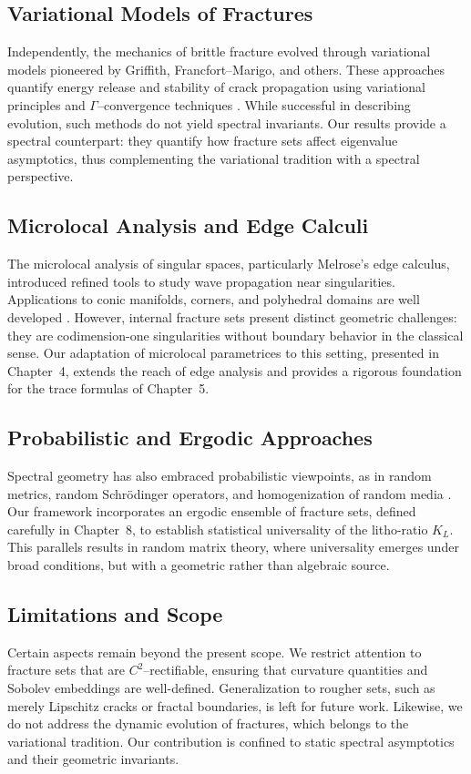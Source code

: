 \subsection{Variational Models of Fractures}
Independently, the mechanics of brittle fracture evolved through variational
models pioneered by Griffith, Francfort--Marigo, and others. These approaches
quantify energy release and stability of crack propagation using variational
principles and $\Gamma$--convergence techniques
\cite{FrancfortMarigo1998, Braides2002}. While successful in describing
evolution, such methods do not yield spectral invariants. Our results provide a
spectral counterpart: they quantify how fracture sets affect eigenvalue
asymptotics, thus complementing the variational tradition with a spectral
perspective.

\subsection{Microlocal Analysis and Edge Calculi}
The microlocal analysis of singular spaces, particularly Melrose's edge
calculus, introduced refined tools to study wave propagation near singularities.
Applications to conic manifolds, corners, and polyhedral domains are well
developed \cite{Melrose1993}. However, internal fracture sets present distinct
geometric challenges: they are codimension-one singularities without boundary
behavior in the classical sense. Our adaptation of microlocal parametrices to
this setting, presented in Chapter~4, extends the reach of edge analysis and
provides a rigorous foundation for the trace formulas of Chapter~5.

\subsection{Probabilistic and Ergodic Approaches}
Spectral geometry has also embraced probabilistic viewpoints, as in random
metrics, random Schrödinger operators, and homogenization of random media
\cite{PasturFigotin1992}. Our framework incorporates an ergodic ensemble of
fracture sets, defined carefully in Chapter~8, to establish statistical
universality of the litho-ratio $K_L$. This parallels results in random matrix
theory, where universality emerges under broad conditions, but with a geometric
rather than algebraic source.

\subsection{Limitations and Scope}
Certain aspects remain beyond the present scope. We restrict attention to
fracture sets that are $C^2$--rectifiable, ensuring that curvature quantities
and Sobolev embeddings are well-defined. Generalization to rougher sets, such as
merely Lipschitz cracks or fractal boundaries, is left for future work. Likewise,
we do not address the dynamic evolution of fractures, which belongs to the
variational tradition. Our contribution is confined to static spectral
asymptotics and their geometric invariants.

